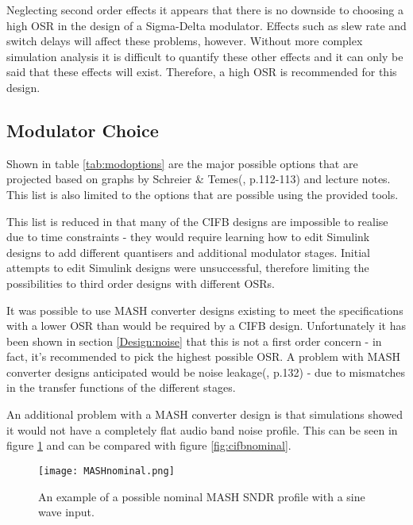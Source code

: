 

Neglecting second order effects it appears that there is no downside to choosing a high OSR in the design of a Sigma-Delta modulator.
Effects such as slew rate and switch delays will affect these problems, however.
Without more complex simulation analysis it is difficult to quantify these other effects and it can only be said that these effects will exist.
Therefore, a high OSR is recommended for this design.

\subsection{Modulator Choice}
Shown in table \ref{tab:modoptions} are the major possible options that are projected based on graphs by Schreier \& Temes(\cite{Schreier2004}, p.112-113) and lecture notes.
This list is also limited to the options that are possible using the provided tools.



This list is reduced in that many of the CIFB designs are impossible to realise due to time constraints - they would require learning how to edit Simulink designs to add different quantisers and additional modulator stages.
Initial attempts to edit Simulink designs were unsuccessful, therefore limiting the possibilities to third order designs with different OSRs.

It was possible to use MASH converter designs existing to meet the specifications with a lower OSR than would be required by a CIFB design.
Unfortunately it has been shown in section \ref{Design:noise} that this is not a first order concern - in fact, it's recommended to pick the highest possible OSR.
A problem with MASH converter designs anticipated would be noise leakage(\cite{Schreier2004}, p.132) - due to mismatches in the transfer functions of the different stages.

An additional problem with a MASH converter design is that simulations showed it would not have a completely flat audio band noise profile.
This can be seen in figure \ref{fig:MASHnominal} and can be compared with figure \ref{fig:cifbnominal}.

\begin{figure}
    \begin{center}
    \texttt{[image: MASHnominal.png]}
    \label{fig:MASHnominal}
    \caption{An example of a possible nominal MASH SNDR profile with a sine wave input.}
    \end{center}
\end{figure}

